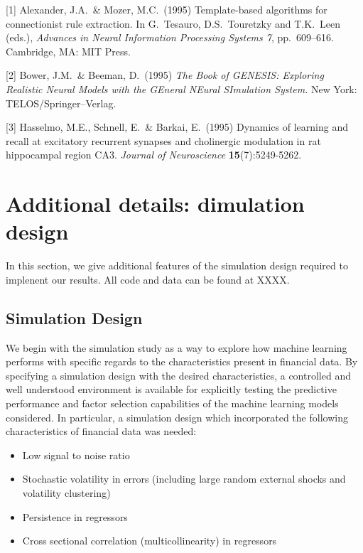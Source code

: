 \documentclass{article}
\begin{document}
\small

[1] Alexander, J.A.\ \& Mozer, M.C.\ (1995) Template-based algorithms for
connectionist rule extraction. In G.\ Tesauro, D.S.\ Touretzky and T.K.\ Leen
(eds.), {\it Advances in Neural Information Processing Systems 7},
pp.\ 609--616. Cambridge, MA: MIT Press.

[2] Bower, J.M.\ \& Beeman, D.\ (1995) {\it The Book of GENESIS: Exploring
  Realistic Neural Models with the GEneral NEural SImulation System.}  New York:
TELOS/Springer--Verlag.

[3] Hasselmo, M.E., Schnell, E.\ \& Barkai, E.\ (1995) Dynamics of learning and
recall at excitatory recurrent synapses and cholinergic modulation in rat
hippocampal region CA3. {\it Journal of Neuroscience} {\bf 15}(7):5249-5262.


\appendix


\section{Additional details: dimulation design}
In this section, we give additional features of the simulation design required to implenent our results. All code and data can be found at XXXX. 

\subsection{Simulation Design}

We begin with the simulation study as a way to explore how machine learning performs with specific regards to the characteristics present in financial data. By specifying a simulation design with the desired characteristics, a controlled and well understood environment is available for explicitly testing the predictive performance and factor selection capabilities of the machine learning models considered. In particular, a simulation design which incorporated the following characteristics of financial data was needed:

\begin{itemize}
	\item Low signal to noise ratio
	\item Stochastic volatility in errors (including large random external shocks and volatility clustering)
	\item Persistence in regressors
	\item Cross sectional correlation (multicollinearity) in regressors
\end{itemize}
\end{document}

